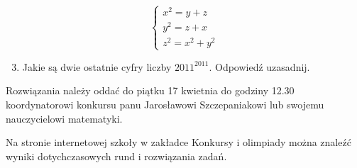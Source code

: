 \documentclass[10pt]{article}
\begin{document}
\[
\left\{\begin{array}{c}
x^{2}=y+z \\
y^{2}=z+x \\
z^{2}=x^{2}+y^{2}
\end{array}\right.
\]

\begin{enumerate}
  \setcounter{enumi}{2}
  \item Jakie są dwie ostatnie cyfry liczby \(2011^{2011}\). Odpowiedź uzasadnij.
\end{enumerate}

Rozwiązania należy oddać do piątku 17 kwietnia do godziny 12.30 koordynatorowi konkursu panu Jarosławowi Szczepaniakowi lub swojemu nauczycielowi matematyki.

Na stronie internetowej szkoły w zakładce Konkursy i olimpiady można znaleźć wyniki dotychczasowych rund i rozwiązania zadań.
\end{document}
